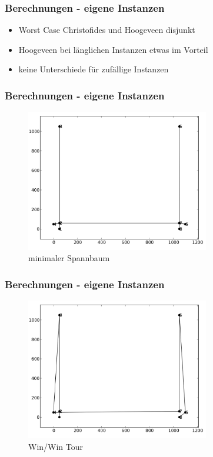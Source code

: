 \documentclass[12pt]{beamer}
\begin{document}
    \begin{frame}
        \frametitle{Berechnungen - eigene Instanzen}
	    \begin{itemize}
                \item Worst Case Christofides und Hoogeveen disjunkt
                \item Hoogeveen bei länglichen Instanzen etwas im Vorteil
                \item keine Unterschiede für zufällige Instanzen
            \end{itemize}
    \end{frame}
    \begin{frame}
        \frametitle{Berechnungen - eigene Instanzen}
        \begin{figure}[H]
            \centering
            \includegraphics[width=8cm]{gfx/hoogeveen_hpp_mst}
            \caption{minimaler Spannbaum}
        \end{figure}
    \end{frame}
    \begin{frame}
        \frametitle{Berechnungen - eigene Instanzen}
        \begin{figure}[H]
            \centering
            \includegraphics[width=8cm]{gfx/hoogeveen_hpp_tour}
            \caption{Win/Win Tour}
        \end{figure}
    \end{frame}
\end{document}
